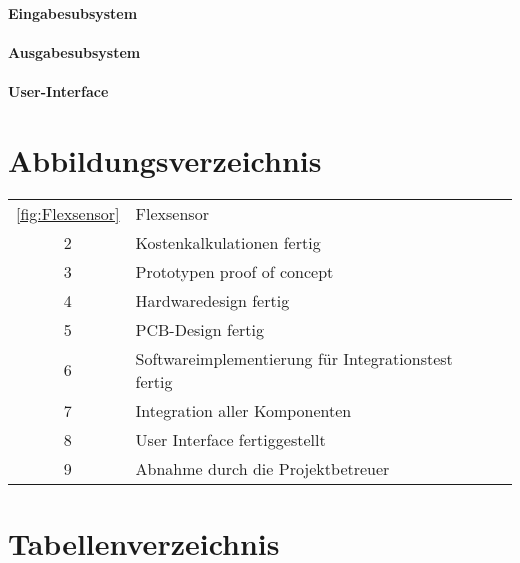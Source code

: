 \documentclass[titlepage,12pt,twoside]{article}
\begin{document}
\paragraph{Eingabesubsystem}

\paragraph{Ausgabesubsystem}

\paragraph{User-Interface}

\newpage
\section{Abbildungsverzeichnis}

\begin{table}[H]
    \centering
    \begin{tabular}{|c|l|c|}  %
        \hline
        \autoref{fig:Flexsensor} & Flexsensor \\
        2 & Kostenkalkulationen fertig \\
        3 & Prototypen proof of concept \\
        4 & Hardwaredesign fertig \\
        5 & PCB-Design fertig \\
        6 & Softwareimplementierung für Integrationstest fertig \\
        7 & Integration aller Komponenten \\
        8 & User Interface fertiggestellt \\
        9 & Abnahme durch die Projektbetreuer \\
        \hline
    \end{tabular}
    \label{tab:Abbildungsverzeichnis}
\end{table}

\newpage
\section{Tabellenverzeichnis}
\end{document}
